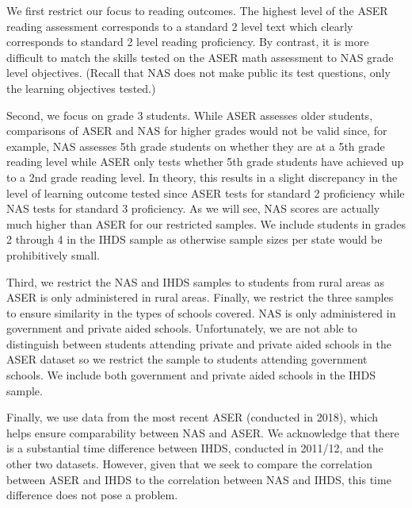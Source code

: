 \documentclass[
  11pt,
]{article}
\begin{document}
We first restrict our focus to reading outcomes. The highest level of the ASER reading assessment corresponds to a standard 2 level text which clearly corresponds to standard 2 level reading proficiency. By contrast, it is more difficult to match the skills tested on the ASER math assessment to NAS grade level objectives. (Recall that NAS does not make public its test questions, only the learning objectives tested.)

Second, we focus on grade 3 students. While ASER assesses older students, comparisons of ASER and NAS for higher grades would not be valid since, for example, NAS assesses 5th grade students on whether they are at a 5th grade reading level while ASER only tests whether 5th grade students have achieved up to a 2nd grade reading level. In theory, this results in a slight discrepancy in the level of learning outcome tested since ASER tests for standard 2 proficiency while NAS tests for standard 3 proficiency. As we will see, NAS scores are actually much higher than ASER for our restricted samples. We include students in grades 2 through 4 in the IHDS sample as otherwise sample sizes per state would be prohibitively small.

Third, we restrict the NAS and IHDS samples to students from rural areas as ASER is only administered in rural areas. Finally, we restrict the three samples to ensure similarity in the types of schools covered. NAS is only administered in government and private aided schools. Unfortunately, we are not able to distinguish between students attending private and private aided schools in the ASER dataset so we restrict the sample to students attending government schools. We include both government and private aided schools in the IHDS sample.

Finally, we use data from the most recent ASER (conducted in 2018), which helps ensure comparability between NAS and ASER. We acknowledge that there is a substantial time difference between IHDS, conducted in 2011/12, and the other two datasets. However, given that we seek to compare the correlation between ASER and IHDS to the correlation between NAS and IHDS, this time difference does not pose a problem.
\end{document}
